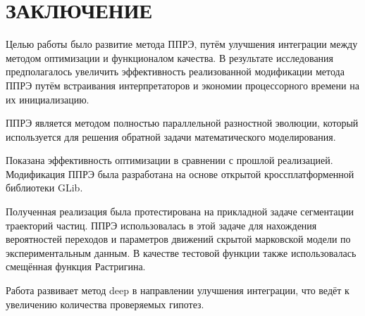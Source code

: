 \chapter*{ЗАКЛЮЧЕНИЕ}

Целью работы было развитие метода ППРЭ,
путём улучшения интеграции
между методом оптимизации
и функционалом качества.
В результате исследования
предполагалось увеличить
эффективность реализованной
модификации метода ППРЭ
путём встраивания интерпретаторов
и экономии процессорного времени
на их инициализацию.

ППРЭ является методом
полностью параллельной разностной эволюции,
который используется для решения
обратной задачи математического моделирования.

Показана эффективность
оптимизации в сравнении с
прошлой реализацией.
Модификация ППРЭ
была разработана на основе
открытой кроссплатформенной
библиотеки GLib.

Полученная реализация
была протестирована на
прикладной задаче
сегментации траекторий частиц.
ППРЭ использовалась в этой задаче
для нахождения вероятностей переходов и
параметров движений
скрытой марковской модели по
экспериментальным данным.
В качестве тестовой функции
также использовалась
смещённая функция Растригина.

Работа развивает метод deep
в направлении улучшения интеграции,
что ведёт к увеличению количества
проверяемых гипотез.

